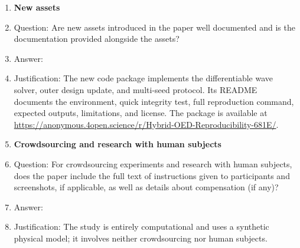 \begin{enumerate}
\item {\bf New assets}
    \item[] Question: Are new assets introduced in the paper well documented and is the documentation provided alongside the assets?
    \item[] Answer: \answerYes{} %
    \item[] Justification: The new code package implements the differentiable
    wave solver, outer design update, and multi-seed protocol. Its README
    documents the environment, quick integrity test, full reproduction command,
    expected outputs, limitations, and license. The package is available at
    \url{https://anonymous.4open.science/r/Hybrid-OED-Reproducibility-681E/}.

\item {\bf Crowdsourcing and research with human subjects}
    \item[] Question: For crowdsourcing experiments and research with human subjects, does the paper include the full text of instructions given to participants and screenshots, if applicable, as well as details about compensation (if any)? 
    \item[] Answer: \answerNA{}
    \item[] Justification: The study is entirely computational and uses a
    synthetic physical model; it involves neither crowdsourcing nor human subjects.


\end{enumerate}
